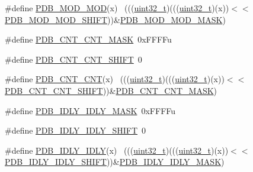 \begin{DoxyCompactItemize}
\item 
\#define \hyperlink{group___p_d_b___register___masks_ga8c8f8dd2b40994da70b3ed8edec15bb0}{P\+D\+B\+\_\+\+M\+O\+D\+\_\+\+M\+OD}(x)                                                  ~(((\hyperlink{_p_e___types_8h_a33594304e786b158f3fb30289278f5af}{uint32\+\_\+t})(((\hyperlink{_p_e___types_8h_a33594304e786b158f3fb30289278f5af}{uint32\+\_\+t})(x))$<$$<$\hyperlink{group___p_d_b___register___masks_gaf224ebff31aea3bd5318f078eccf060e}{P\+D\+B\+\_\+\+M\+O\+D\+\_\+\+M\+O\+D\+\_\+\+S\+H\+I\+FT}))\&\hyperlink{group___p_d_b___register___masks_ga9dddc13b37ba4e27c8401dfa56b2173f}{P\+D\+B\+\_\+\+M\+O\+D\+\_\+\+M\+O\+D\+\_\+\+M\+A\+SK})
\item 
\#define \hyperlink{group___p_d_b___register___masks_ga2c5797892b612935a1eb7ba29ea0d202}{P\+D\+B\+\_\+\+C\+N\+T\+\_\+\+C\+N\+T\+\_\+\+M\+A\+SK}~0x\+F\+F\+F\+Fu
\item 
\#define \hyperlink{group___p_d_b___register___masks_ga684fc86038c1a05d2ba14aa872e551a6}{P\+D\+B\+\_\+\+C\+N\+T\+\_\+\+C\+N\+T\+\_\+\+S\+H\+I\+FT}~0
\item 
\#define \hyperlink{group___p_d_b___register___masks_gaba80630566123d5cf67862a5b024af87}{P\+D\+B\+\_\+\+C\+N\+T\+\_\+\+C\+NT}(x)                                                  ~(((\hyperlink{_p_e___types_8h_a33594304e786b158f3fb30289278f5af}{uint32\+\_\+t})(((\hyperlink{_p_e___types_8h_a33594304e786b158f3fb30289278f5af}{uint32\+\_\+t})(x))$<$$<$\hyperlink{group___p_d_b___register___masks_ga684fc86038c1a05d2ba14aa872e551a6}{P\+D\+B\+\_\+\+C\+N\+T\+\_\+\+C\+N\+T\+\_\+\+S\+H\+I\+FT}))\&\hyperlink{group___p_d_b___register___masks_ga2c5797892b612935a1eb7ba29ea0d202}{P\+D\+B\+\_\+\+C\+N\+T\+\_\+\+C\+N\+T\+\_\+\+M\+A\+SK})
\item 
\#define \hyperlink{group___p_d_b___register___masks_gaa3a9995da0b93a73827d556de3a7f8ec}{P\+D\+B\+\_\+\+I\+D\+L\+Y\+\_\+\+I\+D\+L\+Y\+\_\+\+M\+A\+SK}~0x\+F\+F\+F\+Fu
\item 
\#define \hyperlink{group___p_d_b___register___masks_ga7ce7e734267097f79a8fd2036dc25271}{P\+D\+B\+\_\+\+I\+D\+L\+Y\+\_\+\+I\+D\+L\+Y\+\_\+\+S\+H\+I\+FT}~0
\item 
\#define \hyperlink{group___p_d_b___register___masks_ga07fbca50ea650a4ca32f51bf89ff3732}{P\+D\+B\+\_\+\+I\+D\+L\+Y\+\_\+\+I\+D\+LY}(x)                                              ~(((\hyperlink{_p_e___types_8h_a33594304e786b158f3fb30289278f5af}{uint32\+\_\+t})(((\hyperlink{_p_e___types_8h_a33594304e786b158f3fb30289278f5af}{uint32\+\_\+t})(x))$<$$<$\hyperlink{group___p_d_b___register___masks_ga7ce7e734267097f79a8fd2036dc25271}{P\+D\+B\+\_\+\+I\+D\+L\+Y\+\_\+\+I\+D\+L\+Y\+\_\+\+S\+H\+I\+FT}))\&\hyperlink{group___p_d_b___register___masks_gaa3a9995da0b93a73827d556de3a7f8ec}{P\+D\+B\+\_\+\+I\+D\+L\+Y\+\_\+\+I\+D\+L\+Y\+\_\+\+M\+A\+SK})
$$
\end{DoxyCompactItemize}
